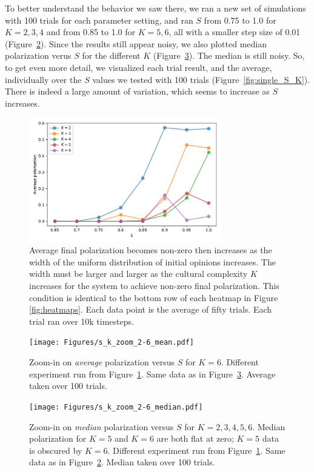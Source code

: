 \documentclass[11pt,letterpaper]{article}
\begin{document}
To better understand the behavior we saw there, we ran a new set of simulations
with 100 trials for each parameter setting, and ran $S$ from 0.75 to 1.0 for
$K=2, 3, 4$ and from 0.85 to 1.0 for $K=5,6$, all with a smaller step size 
of 0.01 (Figure~\ref{fig:zoom_average}). Since the results still appear
noisy, we also plotted median polarization verus $S$ for the different $K$
(Figure~\ref{fig:zoom_median}). The median is still noisy. So, to get even
more detail, we visualized each trial result, and the average, individually
over the $S$ values we tested with 100 trials (Figure~\ref{fig:single_S_K}).
There is indeed a large amount of variation, which seems to increase as $S$
increases.

\begin{figure}[t!]
  \centering
  \includegraphics[width=0.75\textwidth]{Figures/P_vs_S_for_K.pdf}
  \caption{
    Average final polarization becomes non-zero then increases as
    the width of the uniform distribution of initial opinions increases.
    The width must be larger and larger as the cultural complexity $K$ 
    increases for the system to achieve non-zero final polarization. This
    condition is identical to the bottom row of each heatmap in 
    Figure \ref{fig:heatmaps}. Each
    data point is the average of fifty trials. Each trial ran over 
    10k timesteps. 
  }
  \label{fig:p_vs_s_for_k}
\end{figure}


\begin{figure}[t!]
  \centering
    \texttt{[image: Figures/s\_k\_zoom\_2-6\_mean.pdf]}
  \caption{Zoom-in on \emph{average} polarization versus $S$ for $K=6$. 
  Different experiment run from Figure~\ref{fig:p_vs_s_for_k}. 
  Same data as in Figure~\ref{fig:zoom_median}.
  Average taken over 100 trials.}
  \label{fig:zoom_average}
\end{figure}

\begin{figure}[h!]
  \centering
    \texttt{[image: Figures/s\_k\_zoom\_2-6\_median.pdf]}
  \caption{Zoom-in on \emph{median} polarization versus $S$ for $K=2,3,4,5,6$. 
    Median polarization for $K=5$ and $K=6$ are both flat at zero; $K=5$ 
    data is obscured by $K=6$.
    Different experiment run from Figure~\ref{fig:p_vs_s_for_k}.
    Same data as in Figure~\ref{fig:zoom_average}.
    Median taken over 100 trials.
  }
  \label{fig:zoom_median}
\end{figure}
\end{document}
